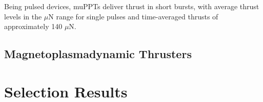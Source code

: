 Being pulsed devices, \ac{muPPT}s deliver thrust in short bursts, with average thrust levels in the $\mu$N range for single pulses and time-averaged thrusts of approximately 140 $\mu$N. 

\subsection{Magnetoplasmadynamic Thrusters}

\section{Selection Results}

